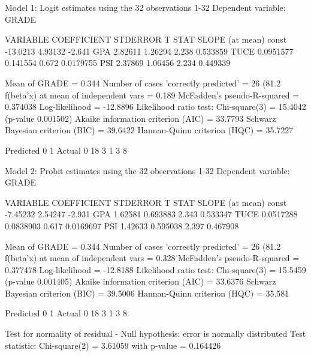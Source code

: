 \begin{table}
  \centering
\begin{code}
Model 1: Logit estimates using the 32 observations 1-32
Dependent variable: GRADE

      VARIABLE       COEFFICIENT        STDERROR      T STAT       SLOPE
                                                                  (at mean)
  const               -13.0213           4.93132      -2.641
  GPA                   2.82611          1.26294       2.238      0.533859   
  TUCE                  0.0951577        0.141554      0.672      0.0179755  
  PSI                   2.37869          1.06456       2.234      0.449339   

  Mean of GRADE = 0.344
  Number of cases 'correctly predicted' = 26 (81.2%
  f(beta'x) at mean of independent vars = 0.189
  McFadden's pseudo-R-squared = 0.374038
  Log-likelihood = -12.8896
  Likelihood ratio test: Chi-square(3) = 15.4042 (p-value 0.001502)
  Akaike information criterion (AIC) = 33.7793
  Schwarz Bayesian criterion (BIC) = 39.6422
  Hannan-Quinn criterion (HQC) = 35.7227

           Predicted
             0    1
  Actual 0  18    3
         1   3    8

Model 2: Probit estimates using the 32 observations 1-32
Dependent variable: GRADE

      VARIABLE       COEFFICIENT        STDERROR      T STAT       SLOPE
                                                                  (at mean)
  const                -7.45232          2.54247      -2.931
  GPA                   1.62581          0.693883      2.343      0.533347   
  TUCE                  0.0517288        0.0838903     0.617      0.0169697  
  PSI                   1.42633          0.595038      2.397      0.467908   

  Mean of GRADE = 0.344
  Number of cases 'correctly predicted' = 26 (81.2%
  f(beta'x) at mean of independent vars = 0.328
  McFadden's pseudo-R-squared = 0.377478
  Log-likelihood = -12.8188
  Likelihood ratio test: Chi-square(3) = 15.5459 (p-value 0.001405)
  Akaike information criterion (AIC) = 33.6376
  Schwarz Bayesian criterion (BIC) = 39.5006
  Hannan-Quinn criterion (HQC) = 35.581

           Predicted
             0    1
  Actual 0  18    3
         1   3    8

Test for normality of residual -
  Null hypothesis: error is normally distributed
  Test statistic: Chi-square(2) = 3.61059
  with p-value = 0.164426
\end{code}
  \caption{Example logit and probit}
  \label{tab:logit-probit}
\end{table}

